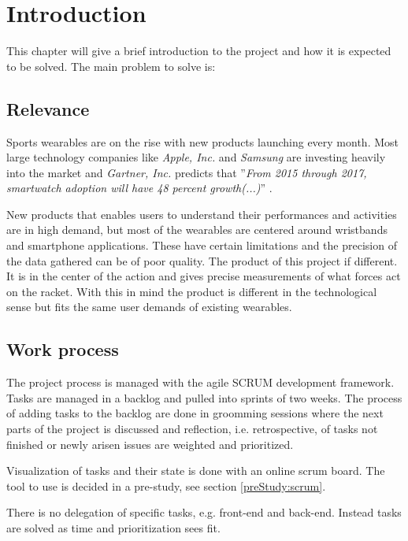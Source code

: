 \chapter{Introduction}
This chapter will give a brief introduction to the project and how it is expected to be solved.
The main problem to solve is:


\section*{Relevance}
Sports wearables are on the rise with new products launching every month. 
Most large technology companies like \textit{Apple, Inc.} and \textit{Samsung} are investing heavily into the market and \textit{Gartner, Inc.} predicts that ''\textit{From 2015 through 2017, smartwatch adoption will have 48 percent growth(...)}'' \citep{introduction:relevance:gartner}.

New products that enables users to understand their performances and activities are in high demand, but most of the wearables are centered around wristbands and smartphone applications. 
These have certain limitations and the precision of the data gathered can be of poor quality.
The product of this project if different. 
It is in the center of the action and gives precise measurements of what forces act on the racket.
With this in mind the product is different in the technological sense but fits the same user demands of existing wearables.

\section*{Work process}
The project process is managed with the agile SCRUM development framework. 
Tasks are managed in a backlog and pulled into sprints of two weeks. 
The process of adding tasks to the backlog are done in groomming sessions where the next parts of the project is discussed and reflection, i.e. retrospective, of tasks not finished or newly arisen issues are weighted and prioritized.

Visualization of tasks and their state is done with an online scrum board. 
The tool to use is decided in a pre-study, see section \ref{preStudy:scrum}.

There is no delegation of specific tasks, e.g. front-end and back-end. 
Instead tasks are solved as time and prioritization sees fit.
